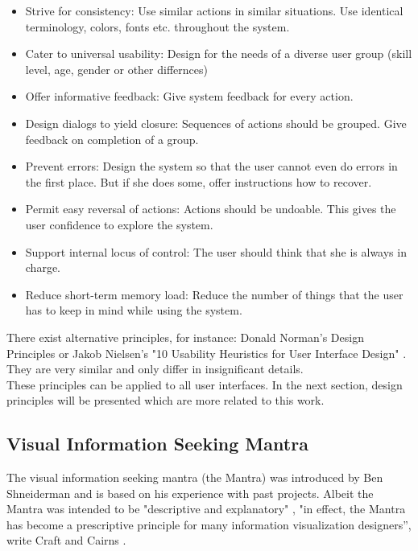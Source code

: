 \documentclass[11pt]{report}
\begin{document}
\begin{itemize}
	\item Strive for consistency: Use similar actions in similar situations. Use identical terminology, colors, fonts etc. throughout the system.	
	\item Cater to universal usability: Design for the needs of a diverse user group (skill level, age, gender or other differnces)
	\item Offer informative feedback: Give system feedback for every action.
	\item Design dialogs to yield closure: Sequences of actions should be grouped. Give feedback on completion of a group.
	\item Prevent errors: Design the system so that the user cannot even do errors in the first place. But if she does some, offer instructions how to recover.
	\item Permit easy reversal of actions: Actions should be undoable. This gives the user confidence to explore the system.
	\item Support internal locus of control: The user should think that she is always in charge.
	\item Reduce short-term memory load: Reduce the number of things that the user has to keep in mind while using the system.
\end{itemize}

There exist alternative principles, for instance: Donald Norman's Design Principles \cite{Norman2013} or Jakob Nielsen's "10 Usability Heuristics for User Interface Design" \cite{Nielsen1995}. They are very similar and only differ in insignificant details.\\

These principles can be applied to all user interfaces. In the next section, design principles will be presented which are more related to this work.

\subsection{Visual Information Seeking Mantra}

The visual information seeking mantra (the Mantra) was introduced by Ben Shneiderman \cite{Shneiderman1996} and is based on his experience with past projects. Albeit the Mantra was intended to be "descriptive and explanatory" \cite{Card1999}, "in effect, the Mantra has become a prescriptive principle for many information visualization designers”, write Craft and Cairns \cite{Craft2005}. \\
\end{document}
